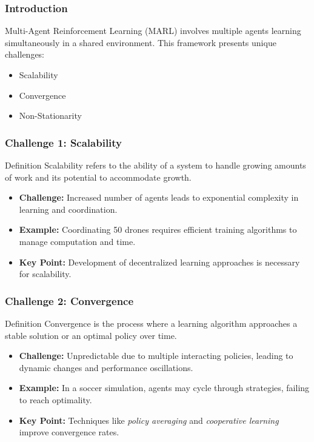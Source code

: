 \documentclass[aspectratio=169]{beamer}
\begin{document}
\begin{frame}[fragile]
    \frametitle{Introduction}
    Multi-Agent Reinforcement Learning (MARL) involves multiple agents learning simultaneously in a shared environment. 
    This framework presents unique challenges:
    \begin{itemize}
        \item Scalability
        \item Convergence
        \item Non-Stationarity
    \end{itemize}
\end{frame}

\begin{frame}[fragile]
    \frametitle{Challenge 1: Scalability}
    \begin{block}{Definition}
        Scalability refers to the ability of a system to handle growing amounts of work and its potential to accommodate growth.
    \end{block}
    \begin{itemize}
        \item \textbf{Challenge:} Increased number of agents leads to exponential complexity in learning and coordination.
        \item \textbf{Example:} Coordinating 50 drones requires efficient training algorithms to manage computation and time.
        \item \textbf{Key Point:} Development of decentralized learning approaches is necessary for scalability.
    \end{itemize}
\end{frame}

\begin{frame}[fragile]
    \frametitle{Challenge 2: Convergence}
    \begin{block}{Definition}
        Convergence is the process where a learning algorithm approaches a stable solution or an optimal policy over time.
    \end{block}
    \begin{itemize}
        \item \textbf{Challenge:} Unpredictable due to multiple interacting policies, leading to dynamic changes and performance oscillations.
        \item \textbf{Example:} In a soccer simulation, agents may cycle through strategies, failing to reach optimality.
        \item \textbf{Key Point:} Techniques like \textit{policy averaging} and \textit{cooperative learning} improve convergence rates.
    \end{itemize}
\end{frame}
\end{document}
